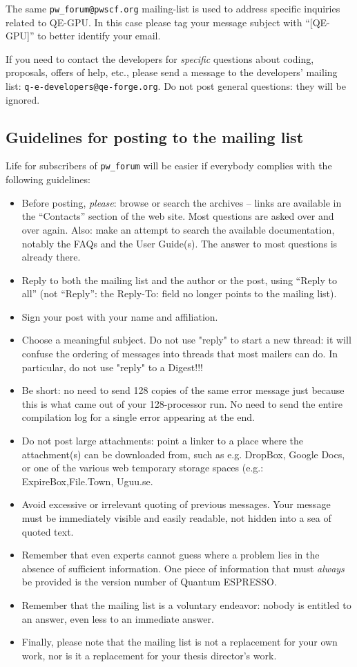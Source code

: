 \documentclass[12pt,a4paper]{article}
\def\qe{{\sc Quantum ESPRESSO}}
\begin{document}
The same \texttt{pw\_forum@pwscf.org} mailing-list is used to address
specific inquiries related to QE-GPU. In this case please tag your message
subject with ``[QE-GPU]'' to better identify your email.

If you need to contact the developers for {\em specific} questions
about coding, proposals, offers of help, etc., please send a message
to the developers' mailing list: \texttt{q-e-developers@qe-forge.org}.
Do not post general questions: they will be ignored.

\subsection{Guidelines for posting to the mailing list}
\label{SubSec:Guidelines}
Life for subscribers of \texttt{pw\_forum} will be easier if everybody
complies with the following guidelines:
\begin{itemize}
\item Before posting, {\em please}: browse or search the archives --
  links are available in the ``Contacts'' section  of the   web site.
  Most questions are asked over and over again. Also: make an attempt
  to search the
  available documentation, notably the FAQs and the User Guide(s).
  The answer to most questions is already there.
\item Reply to both the mailing list and the author or the post, using
  ``Reply to all'' (not ``Reply'': the Reply-To: field no longer points
   to the mailing list).
\item Sign your post with your name and affiliation.
\item Choose a meaningful subject. Do not use "reply" to start a new
  thread:
  it will confuse the ordering of messages into threads that most mailers
  can do. In particular, do not use "reply" to a Digest!!!
\item Be short: no need to send 128 copies of the same error message just
  because this is what came out of your 128-processor run. No need to
  send the entire compilation log for a single error appearing at the end.
\item Do not post large attachments: point a linker to a place where the
  attachment(s) can be downloaded from, such as e.g. DropBox, Google Docs, 
  or one of the various web temporary storage spaces (e.g.: 
  ExpireBox,File.Town, Uguu.se.
\item Avoid excessive or irrelevant quoting of previous messages. Your
  message must be immediately visible and easily readable, not hidden
  into a sea of quoted text.
\item Remember that even experts cannot guess where a problem lies in
  the absence of sufficient information. One piece of information that
  must {\em always} be provided is the version number of \qe.
\item Remember that the mailing list is a voluntary endeavor: nobody is
  entitled to an answer, even less to an immediate answer.
\item Finally, please note that the mailing list is not a replacement
  for your own work, nor is it a replacement for your thesis director's
  work.
\end{itemize}
\end{document}
